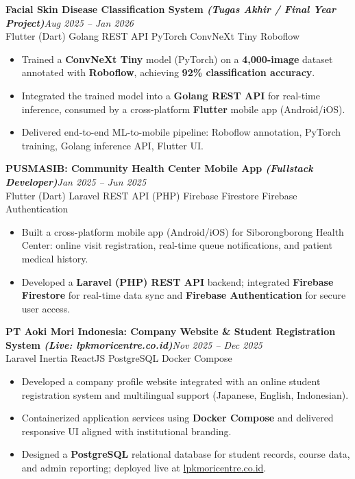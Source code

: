 \documentclass[9.5pt,a4paper]{article}
\newcommand{\cvproject}[3]{%
  {\textbf{#1}\hfill\textit{\color{accentgray}#2}\\
  \footnotesize\color{accentgray}#3}
}
\begin{document}
\vspace{3pt}

\cvproject{Facial Skin Disease Classification System \normalfont\textit{(Tugas Akhir / Final Year Project)}}{Aug 2025 -- Jan 2026}{Flutter (Dart) \textbullet{} Golang REST API \textbullet{} PyTorch \textbullet{} ConvNeXt Tiny \textbullet{} Roboflow}
\begin{itemize}
  \item Trained a \textbf{ConvNeXt Tiny} model (PyTorch) on a \textbf{4,000-image} dataset annotated with \textbf{Roboflow}, achieving \textbf{92\% classification accuracy}.
  \item Integrated the trained model into a \textbf{Golang REST API} for real-time inference, consumed by a cross-platform \textbf{Flutter} mobile app (Android/iOS).
  \item Delivered end-to-end ML-to-mobile pipeline: Roboflow annotation, PyTorch training, Golang inference API, Flutter UI.
\end{itemize}

\vspace{3pt}

\cvproject{PUSMASIB: Community Health Center Mobile App \normalfont\textit{(Fullstack Developer)}}{Jan 2025 -- Jun 2025}{Flutter (Dart) \textbullet{} Laravel REST API (PHP) \textbullet{} Firebase Firestore \textbullet{} Firebase Authentication}
\begin{itemize}
  \item Built a cross-platform mobile app (Android/iOS) for Siborongborong Health Center: online visit registration, real-time queue notifications, and patient medical history.
  \item Developed a \textbf{Laravel (PHP) REST API} backend; integrated \textbf{Firebase Firestore} for real-time data sync and \textbf{Firebase Authentication} for secure user access.
\end{itemize}

\vspace{3pt}

\cvproject{PT Aoki Mori Indonesia: Company Website \& Student Registration System \normalfont\textit{(Live: lpkmoricentre.co.id)}}{Nov 2025 -- Dec 2025}{Laravel Inertia \textbullet{} ReactJS \textbullet{} PostgreSQL \textbullet{} Docker Compose}
\begin{itemize}
  \item Developed a company profile website integrated with an online student registration system and multilingual support (Japanese, English, Indonesian).
  \item Containerized application services using \textbf{Docker Compose} and delivered responsive UI aligned with institutional branding.
  \item Designed a \textbf{PostgreSQL} relational database for student records, course data, and admin reporting; deployed live at \href{https://lpkmoricentre.co.id}{lpkmoricentre.co.id}.
\end{itemize}
\end{document}
